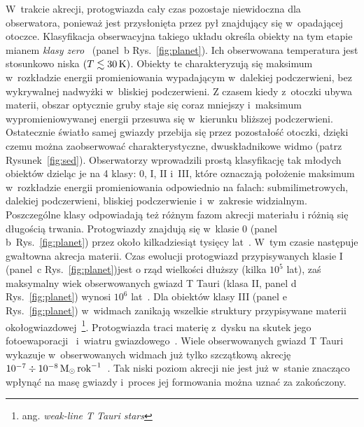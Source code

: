 W~trakcie akrecji, protogwiazda cały czas pozostaje niewidoczna dla obserwatora,
ponieważ jest przysłonięta przez pył znajdujący się w~opadającej otoczce.
Klasyfikacja obserwacyjna takiego układu określa obiekty na tym etapie mianem
\emph{klasy zero}~\cite{andre} (panel~b Rys.~\ref{fig:planet}). Ich obserwowana temperatura jest
stosunkowo niska $(T \lesssim 30\hbox{$\thinspace\textrm{K}$})$. Obiekty te charakteryzują się maksimum
w~rozkładzie energii promieniowania wypadającym w~dalekiej podczerwieni, bez
wykrywalnej nadwyżki w~bliskiej podczerwieni. Z czasem kiedy z~otoczki ubywa
materii, obszar optycznie gruby staje się coraz mniejszy i~maksimum
wypromieniowywanej energii przesuwa się w~kierunku bliższej podczerwieni.
Ostatecznie światło samej gwiazdy przebija się przez pozostałość otoczki, dzięki
czemu można zaobserwować charakterystyczne, dwuskładnikowe widmo (patrz
Rysunek~\ref{fig:sed}). Obserwatorzy wprowadzili prostą klasyfikację tak młodych
obiektów dzieląc je na 4 klasy: 0, I, II i~III, które oznaczają położenie
maksimum w~rozkładzie energii promieniowania odpowiednio na falach:
submilimetrowych, dalekiej podczerwieni, bliskiej podczerwienie i~w~zakresie
widzialnym. Poszczególne klasy odpowiadają też różnym fazom akrecji materiału i
różnią się długością trwania. Protogwiazdy znajdują się w~klasie 0 (panel
b~Rys.~\ref{fig:planet}) przez około
kilkadziesiąt tysięcy lat~\cite{FSSK06}. W~tym czasie następuje gwałtowna
akrecja materii.  Czas ewolucji protogwiazd przypisywanych klasie I (panel~c Rys.~\ref{fig:planet})jest o rząd wielkości
dłuższy (kilka $10^5$ lat), zaś maksymalny wiek obserwowanych gwiazd T Tauri
(klasa II, panel d Rys.~\ref{fig:planet}) wynosi $10^6$ lat~\cite{HCGD98}.  Dla
obiektów klasy III (panel e Rys.~\ref{fig:planet}) w~widmach zanikają wszelkie
struktury przypisywane materii okołogwiazdowej~\footnote{ang. \emph{weak-line T
Tauri stars}}.  Protogwiazda traci materię z~dysku na skutek jego
fotoewaporacji~\cite{ACP06} i~wiatru gwiazdowego~\cite{PN86}. Wiele
obserwowanych gwiazd T Tauri wykazuje w~obserwowanych widmach już tylko
szczątkową akrecję $10^{-7} \div 10^{-8} \hbox{$\mathrm{\thinspace M_{\odot}}$}\hbox{$\thinspace\textrm{rok}$}^{-1}$~\cite{Hart98}. Tak
niski poziom akrecji nie jest już w~stanie znacząco wpłynąć na masę gwiazdy
i~proces jej formowania można uznać za zakończony.

